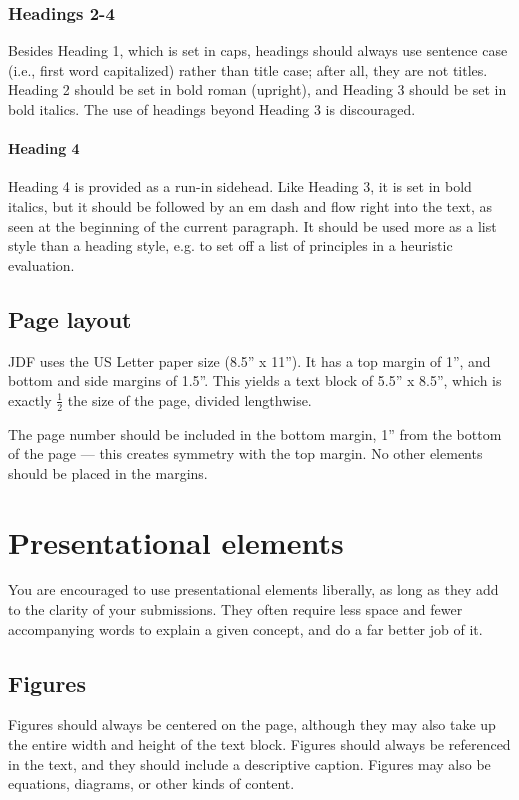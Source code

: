 {{{{\subsubsection{Headings 2-4}
Besides Heading 1, which is set in caps, headings should always use sentence case (i.e., first word capitalized) rather than title case; after all, they are not titles. Heading 2 should be set in bold roman (upright), and Heading 3 should be set in bold italics. The use of headings beyond Heading 3 is discouraged.

\paragraph{Heading 4}
Heading 4 is provided as a run-in sidehead. Like Heading 3, it is set in bold italics, but it should be followed by an em dash and flow right into the text, as seen at the beginning of the current paragraph. It should be used more as a list style than a heading style, e.g. to set off a list of principles in a heuristic evaluation.

\subsection{Page layout}
JDF uses the US Letter paper size (8.5'' x 11''). It has a top margin of 1'', and bottom and side margins of 1.5''. This yields a text block of 5.5'' x 8.5'', which is exactly $\frac{1}{2}$ the size of the page, divided lengthwise.

The page number should be included in the bottom margin, 1'' from the bottom of the page --- this creates symmetry with the top margin. No other elements should be placed in the margins.

\section{Presentational elements}
You are encouraged to use presentational elements liberally, as long as they add to the clarity of your submissions. They often require less space and fewer accompanying words to explain a given concept, and do a far better job of it.

\subsection{Figures}
Figures should always be centered on the page, although they may also take up the entire width and height of the text block. Figures should always be referenced in the text, and they should include a descriptive caption. Figures may also be equations, diagrams, or other kinds of content.

}}}}
